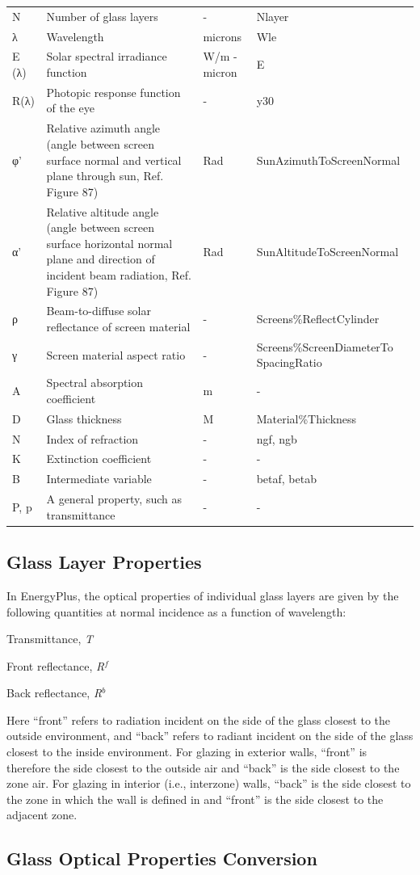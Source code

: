 \begin{longtable}[c]{p{0.8in}p{2.5in}p{1.2in}p{1.5in}}
N & Number of glass layers & - & Nlayer \tabularnewline
λ & Wavelength & microns & Wle \tabularnewline
E  (λ) & Solar spectral irradiance function & W/m  -micron & E \tabularnewline
R(λ) & Photopic response function of the eye & - & y30 \tabularnewline
φ' & Relative azimuth angle (angle between screen surface normal and vertical plane through sun, Ref. Figure 87) & Rad & SunAzimuthToScreenNormal \tabularnewline
α' & Relative altitude angle (angle between screen surface horizontal normal plane and direction of incident beam radiation, Ref. Figure 87) & Rad & SunAltitudeToScreenNormal \tabularnewline
ρ & Beam-to-diffuse solar reflectance of screen material & - & Screens\%ReflectCylinder \tabularnewline
γ & Screen material aspect ratio & - & Screens\%ScreenDiameterTo SpacingRatio \tabularnewline
Α & Spectral absorption coefficient & m & - \tabularnewline
D & Glass thickness & M & Material\%Thickness \tabularnewline
N & Index of refraction & - & ngf, ngb \tabularnewline
Κ & Extinction coefficient & - & - \tabularnewline
Β & Intermediate variable & - & betaf, betab \tabularnewline
P, p & A general property, such as transmittance & - & - \tabularnewline
\bottomrule
\end{longtable}

\subsection{Glass Layer Properties}\label{glass-layer-properties}

In EnergyPlus, the optical properties of individual glass layers are given by the following quantities at normal incidence as a function of wavelength:

Transmittance, \emph{T}

Front reflectance, \emph{R\(^{f}\)}

Back reflectance, \emph{R\(^{b}\)}

Here ``front'' refers to radiation incident on the side of the glass closest to the outside environment, and ``back'' refers to radiant incident on the side of the glass closest to the inside environment. For glazing in exterior walls, ``front'' is therefore the side closest to the outside air and ``back'' is the side closest to the zone air. For glazing in interior (i.e., interzone) walls, ``back'' is the side closest to the zone in which the wall is defined in and ``front'' is the side closest to the adjacent zone.

\subsection{Glass Optical Properties Conversion}\label{glass-optical-properties-conversion}

